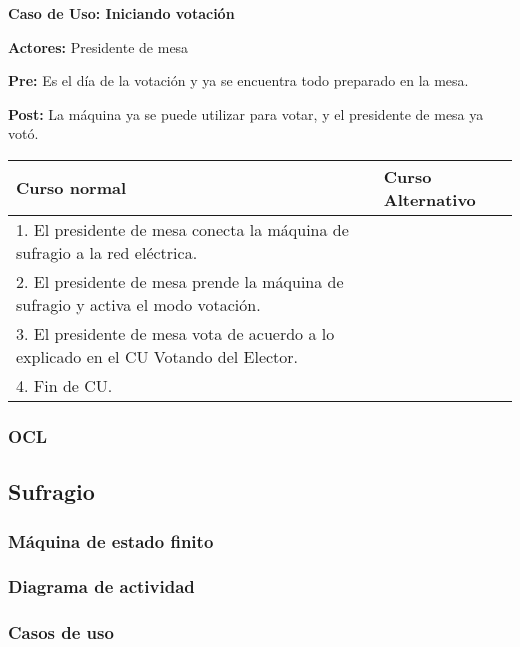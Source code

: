 \textbf{Caso de Uso: Iniciando votación}

\textbf{Actores:} Presidente de mesa

\textbf{Pre:} Es el día de la votación y ya se encuentra todo preparado en la mesa.

\textbf{Post:} La máquina ya se puede utilizar para votar, y el presidente de mesa ya votó.

\begin{table}[h!]
	
 \begin{tabular}{|p{7.5cm} | p{7.5cm}|} 
 \hline
 \textbf{Curso normal} & \textbf{Curso Alternativo} \\
 \hline

1. El presidente de mesa conecta la máquina de sufragio a la red eléctrica. & \\
\hline
2. El presidente de mesa prende la máquina de sufragio y activa el modo votación. & \\
\hline
3. El presidente de mesa vota de acuerdo a lo explicado en el CU Votando del Elector. & \\
\hline
4. Fin de CU.& \\
\hline



 \end{tabular}

\end{table}

\subsubsection{OCL}





\subsection{Sufragio}

\subsubsection{Máquina de estado finito}

\subsubsection{Diagrama de actividad}

\subsubsection{Casos de uso}

